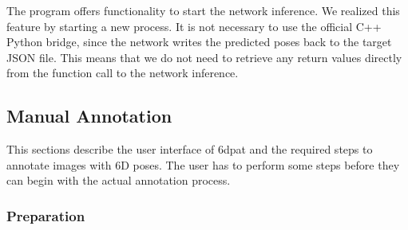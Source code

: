 The program offers functionality to start the network inference. We realized this feature by starting a new process. It is not necessary to use the official C++ Python bridge, since the network writes the predicted poses back to the target JSON file. This means that we do not need to retrieve any return values directly from the function call to the network inference.

\subsection{Manual Annotation} 

This sections describe the user interface of \gls{6dpat} and the required steps to annotate images with 6D poses. The user has to perform some steps before they can begin with the actual annotation process. 

\subsubsection{Preparation}

